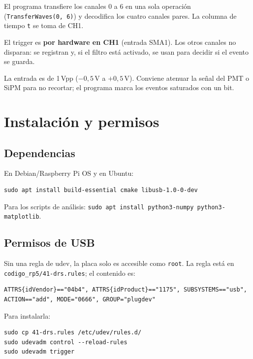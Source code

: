 \documentclass[11pt,a4paper]{article}
\newcommand{\code}[1]{\texttt{#1}}
\begin{document}
El programa transfiere los canales 0 a 6 en una sola operación
(\code{TransferWaves(0, 6)}) y decodifica los cuatro canales pares. La columna de
tiempo \code{t} se toma de CH1.

\begin{nota}
El trigger es \textbf{por hardware en CH1} (entrada SMA1). Los otros canales no
disparan: se registran y, si el filtro está activado, se usan para decidir si el
evento se guarda.
\end{nota}

La entrada es de 1\,Vpp ($-0{,}5$\,V a $+0{,}5$\,V). Conviene atenuar la señal del PMT
o SiPM para no recortar; el programa marca los eventos saturados con un bit.

\section{Instalación y permisos}

\subsection{Dependencias}

En Debian/Raspberry Pi OS y en Ubuntu:

\begin{lstlisting}[style=shell]
sudo apt install build-essential cmake libusb-1.0-0-dev
\end{lstlisting}

Para los scripts de análisis: \code{sudo apt install python3-numpy python3-matplotlib}.

\subsection{Permisos de USB}

Sin una regla de udev, la placa solo es accesible como \code{root}. La regla está en
\code{codigo\_rp5/41-drs.rules}; el contenido es:

\begin{lstlisting}[style=shell]
ATTRS{idVendor}=="04b4", ATTRS{idProduct}=="1175", SUBSYSTEMS=="usb",
ACTION=="add", MODE="0666", GROUP="plugdev"
\end{lstlisting}

Para instalarla:

\begin{lstlisting}[style=shell]
sudo cp 41-drs.rules /etc/udev/rules.d/
sudo udevadm control --reload-rules
sudo udevadm trigger
\end{lstlisting}
\end{document}
